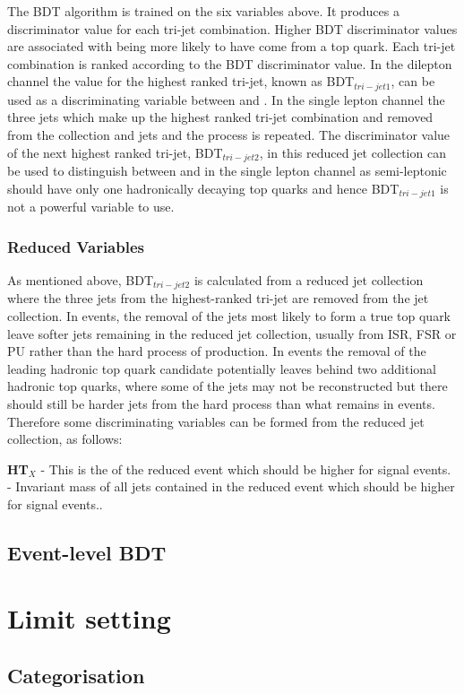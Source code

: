 The BDT algorithm is trained on the six variables above. It produces a discriminator value for each tri-jet combination. Higher BDT discriminator values are associated with being more likely to have come from a top quark. Each tri-jet combination is ranked according to the BDT discriminator value. In the dilepton channel the value for the highest ranked tri-jet, known as BDT$_{tri-jet1}$, can be used as a discriminating variable between \tttt and \ttbar. In the single lepton channel the three jets which make up the highest ranked tri-jet combination and removed from the collection and jets and the process is repeated. The discriminator value of the next highest ranked tri-jet, BDT$_{tri-jet2}$, in this reduced jet collection can be used to distinguish between \tttt and \ttbar in the single lepton channel as semi-leptonic \ttbar should have only one hadronically decaying top quarks and hence BDT$_{tri-jet1}$ is not a powerful variable to use.

\subsubsection{Reduced Variables}
As mentioned above, BDT$_{tri-jet2}$ is calculated from a reduced jet collection where the three jets from the highest-ranked tri-jet are removed from the jet collection. In \ttbar events, the removal of the jets most likely to form a true top quark leave softer jets remaining in the reduced jet collection, usually from ISR, FSR or PU rather than the hard process of \ttbar production. In \tttt events the removal of the leading hadronic top quark candidate potentially leaves behind two additional hadronic top quarks, where some of the jets may not be reconstructed but there should still be harder jets from the hard process than what remains in \ttbar events. Therefore some discriminating variables can be formed from the reduced jet collection, as follows:

\textbf{HT$_{X}$} - This is the \HT of the reduced event which should be higher for signal \tttt events.\\
\textbf{\sumjetmassX} - Invariant mass of all jets contained in the reduced event which should be higher for signal \tttt events..

\subsection{Event-level BDT}

\section{Limit setting}

\subsection{Categorisation}
\label{sec:Cats}





